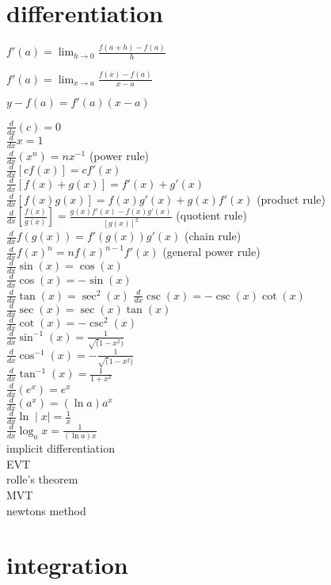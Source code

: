 \documentclass{article}
\begin{document}
\newpage
\section*{differentiation}

\begin{center} $f'(a) = \lim_{h \to 0}\frac{f(a + h) - f(a)}{h}$ \end{center}
\begin{center} $f'(a) = \lim_{x \to a}\frac{f(x) - f(a)}{x - a}$ \end{center}
\begin{center} $y - f(a) = f'(a)(x - a)$ \end{center}

$\frac{d}{dx}(c) = 0$\\
$\frac{d}{dx}x = 1$\\
$\frac{d}{dx}(x^n) = nx^{-1}$ (power rule)\\
$\frac{d}{dx}[cf(x)] = cf'(x)$\\
$\frac{d}{dx}[f(x)+g(x)] = f'(x) + g'(x)$\\
$\frac{d}{dx}[f(x)g(x)] = f(x)g'(x) + g(x)f'(x)$ (product rule)\\
$\frac{d}{dx}[\frac{f(x)}{g(x)}] = \frac{g(x)f'(x) - f(x)g'(x)}{[g(x)]^2}$ (quotient rule)\\
$\frac{d}{dx}f(g(x)) = f'(g(x))g'(x)$ (chain rule)\\
$\frac{d}{dx}f(x)^n = nf(x)^{n-1}f'(x)$ (general power rule)\\
$\frac{d}{dx}\sin(x) = \cos(x)$\\ 
$\frac{d}{dx}\cos(x) = -\sin(x)$\\
$\frac{d}{dx}\tan(x) = \sec^2(x)$
$\frac{d}{dx}\csc(x) = -\csc(x)\cot(x)$\\
$\frac{d}{dx}\sec(x) = \sec(x)\tan(x)$\\
$\frac{d}{dx}\cot(x) = -\csc^2(x)$\\
$\frac{d}{dx}\sin^{-1}(x) = \frac{1}{\sqrt(1 - x^2)}$\\
$\frac{d}{dx}\cos^{-1}(x) = -\frac{1}{\sqrt(1 - x^2)}$\\
$\frac{d}{dx}\tan^{-1}(x) = \frac{1}{1 + x^2}$\\
$\frac{d}{dx}(e^x) = e^x$\\
$\frac{d}{dx}(a^x) = (\ln a)a^x$\\
$\frac{d}{dx}\ln\mid x\mid = \frac{1}{x}$\\
$\frac{d}{dx}\log_ax = \frac{1}{(\ln a)x}$\\


implicit differentiation\\
EVT\\
rolle's theorem\\
MVT\\
newtons method\\


\section*{integration}
\end{document}
